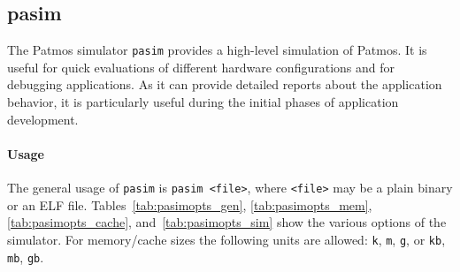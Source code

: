 \documentclass[a4paper,fontsize=10pt,twoside,DIV15,BCOR12mm,headinclude=true,footinclude=false,pagesize,bibtotoc]{scrbook}
\begin{document}
\subsection{pasim}

The Patmos simulator \texttt{pasim} provides a high-level simulation
of Patmos. It is useful for quick evaluations of different hardware
configurations and for debugging applications. As it can provide
detailed reports about the application behavior, it is particularly
useful during the initial phases of application development.

\paragraph{Usage} The general usage of \texttt{pasim} is \texttt{pasim
  <file>}, where \texttt{<file>} may be a plain binary or an ELF
file. Tables~\ref{tab:pasimopts_gen}, \ref{tab:pasimopts_mem},
\ref{tab:pasimopts_cache}, and~\ref{tab:pasimopts_sim} show the
various options of the simulator. For memory/cache sizes the following
units are allowed: \texttt{k}, \texttt{m}, \texttt{g}, or \texttt{kb},
\texttt{mb}, \texttt{gb}.
\end{document}
